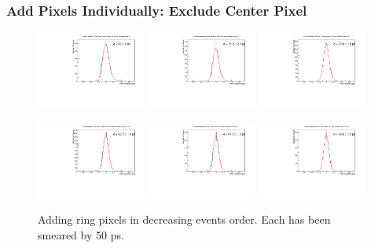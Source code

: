 \documentclass[twocolumn,aps,prd,reprint,superscriptaddress,floatfix]{revtex4-1}
\begin{document}
\subsubsection{Add Pixels Individually: Exclude Center Pixel}
\begin{figure}[!htbp]
\centering
	\includegraphics[width=0.32\textwidth]{SKIROC_1_Pixels_NoCenter50.pdf}
	\includegraphics[width=0.32\textwidth]{SKIROC_2_Pixels_NoCenter50.pdf}
	\includegraphics[width=0.32\textwidth]{SKIROC_3_Pixels_NoCenter50.pdf}

	\includegraphics[width=0.32\textwidth]{SKIROC_4_Pixels_NoCenter50.pdf}
	\includegraphics[width=0.32\textwidth]{SKIROC_5_Pixels_NoCenter50.pdf}
	\includegraphics[width=0.32\textwidth]{SKIROC_6_Pixels_NoCenter50.pdf}
	\caption{Adding ring pixels in decreasing events order.
		Each has been smeared by 50 ps.}
	\label{fig:50psAll_NoCenter}
\end{figure}
\end{document}
